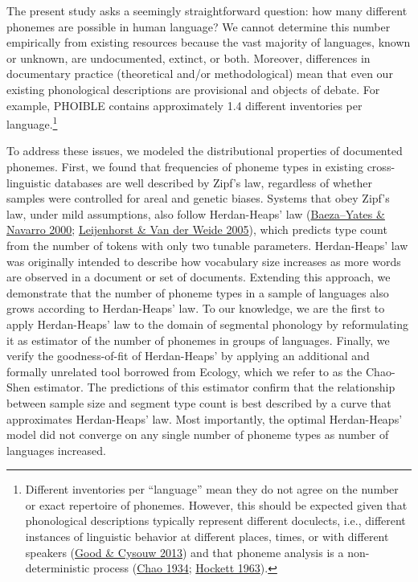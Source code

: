 \documentclass[
]{article}
\begin{document}
The present study asks a seemingly straightforward question: how many
different phonemes are possible in human language? We cannot determine
this number empirically from existing resources because the vast
majority of languages, known or unknown, are undocumented, extinct, or
both. Moreover, differences in documentary practice (theoretical and/or
methodological) mean that even our existing phonological descriptions
are provisional and objects of debate. For example, PHOIBLE contains
approximately 1.4 different inventories per language.\footnote{Different
  inventories per ``language'' mean they do not agree on the number or
  exact repertoire of phonemes. However, this should be expected given
  that phonological descriptions typically represent different
  doculects, i.e., different instances of linguistic behavior at
  different places, times, or with different speakers
  (\protect\hyperlink{ref-GoodCysouw2013}{Good \& Cysouw 2013}) and that
  phoneme analysis is a non-deterministic process
  (\protect\hyperlink{ref-Chao1934}{Chao 1934};
  \protect\hyperlink{ref-Hockett1963}{Hockett 1963}).}

To address these issues, we modeled the distributional properties of
documented phonemes. First, we found that frequencies of phoneme types
in existing cross-linguistic databases are well described by Zipf's law,
regardless of whether samples were controlled for areal and genetic
biases. Systems that obey Zipf's law, under mild assumptions, also
follow Herdan-Heaps' law
(\protect\hyperlink{ref-BaezaNavarro2000}{Baeza--Yates \& Navarro 2000};
\protect\hyperlink{ref-vanLeijenhorst2005}{Leijenhorst \& Van der Weide
2005}), which predicts type count from the number of tokens with only
two tunable parameters. Herdan-Heaps' law was originally intended to
describe how vocabulary size increases as more words are observed in a
document or set of documents. Extending this approach, we demonstrate
that the number of phoneme types in a sample of languages also grows
according to Herdan-Heaps' law. To our knowledge, we are the first to
apply Herdan-Heaps' law to the domain of segmental phonology by
reformulating it as estimator of the number of phonemes in groups of
languages. Finally, we verify the goodness-of-fit of Herdan-Heaps' by
applying an additional and formally unrelated tool borrowed from
Ecology, which we refer to as the Chao-Shen estimator. The predictions
of this estimator confirm that the relationship between sample size and
segment type count is best described by a curve that approximates
Herdan-Heaps' law. Most importantly, the optimal Herdan-Heaps' model did
not converge on any single number of phoneme types as number of
languages increased.
\end{document}
